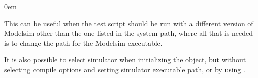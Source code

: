 \documentclass[letterpaper,10pt,english]{sphinxmanual}
\begin{document}
\begin{DUlineblock}{0em}
\item[] This can be useful when the test script should be run with a different version of Modelsim other than the
one listed in the system path, where all that is needed is to change the path for the Modelsim executable.
\item[] It is also possible to select simulator when initializing the {\hyperref[\detokenize{api:hdlregression}]{}} object, but without selecting
compile options and setting simulator executable path, or by using {\hyperref[\detokenize{cli::doc}]{}}.
\end{DUlineblock}

\begin{sphinxVerbatim}[commandchars=\\\{\}]
  
\end{sphinxVerbatim}
\end{document}
